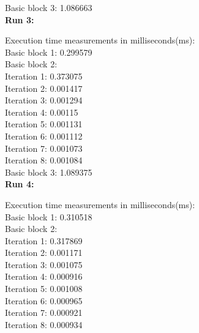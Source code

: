 Basic block 3: 1.086663\\

\textbf{Run 3:}

Execution time measurements in milliseconds(ms):\\

Basic block 1: 0.299579\\

Basic block 2:\\
\hspace{2em} Iteration 1: 0.373075\\
\hspace{2em} Iteration 2: 0.001417\\
\hspace{2em} Iteration 3: 0.001294\\
\hspace{2em} Iteration 4: 0.00115\\
\hspace{2em} Iteration 5: 0.001131\\
\hspace{2em} Iteration 6: 0.001112\\
\hspace{2em} Iteration 7: 0.001073\\
\hspace{2em} Iteration 8: 0.001084\\

Basic block 3: 1.089375\\

\textbf{Run 4:}

Execution time measurements in milliseconds(ms):\\

Basic block 1: 0.310518\\

Basic block 2:\\
\hspace{2em} Iteration 1: 0.317869\\
\hspace{2em} Iteration 2: 0.001171\\
\hspace{2em} Iteration 3: 0.001075\\
\hspace{2em} Iteration 4: 0.000916\\
\hspace{2em} Iteration 5: 0.001008\\
\hspace{2em} Iteration 6: 0.000965\\
\hspace{2em} Iteration 7: 0.000921\\
\hspace{2em} Iteration 8: 0.000934\\

